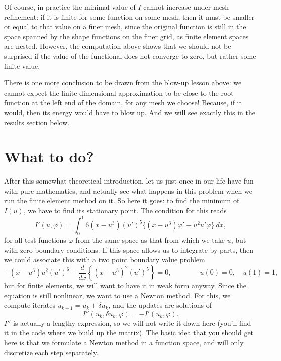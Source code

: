 \documentclass{article}
\begin{document}
Of course, in practice the minimal value of $I$ cannot increase under mesh
refinement: if it is finite for some function on some mesh, then it must be
smaller or equal to that value on a finer mesh, since the original function is
still in the space spanned by the shape functions on the finer grid, as finite
element spaces are nested. However, the computation above shows that we should
not be surprised if the value of the functional does not converge to zero, but
rather some finite value.

There is one more conclusion to be drawn from the blow-up lesson above: we
cannot expect the finite dimensional approximation to be close to the root
function at the left end of the domain, for any mesh we choose! Because, if it
would, then its energy would have to blow up. And we will see exactly this
in the results section below.


\section{What to do?}

After this somewhat theoretical introduction, let us just once in our life
have fun with pure mathematics, and actually see what happens in this problem
when we run the finite element method on it. So here it goes: to find the
minimum of $I(u)$, we have to find its stationary point. The condition for
this reads
\begin{equation*}
  I'(u,\varphi) 
  = 
  \int_0^1 6 (x-u^3) (u')^5 \{ (x-u^3)\varphi' - u^2 u' \varphi\}\ dx,
\end{equation*}
for all test functions $\varphi$ from the same space as that from which we
take $u$, but with zero boundary conditions. If this space allows us to
integrate by parts, then we could associate this with a two point boundary
value problem
\begin{equation*}
  -(x-u^3) u^2(u')^6
  - \frac{d}{dx} \left\{(x-u^3)^2 (u')^5\right\} = 0,
  \qquad\qquad u(0)=0,
  \quad u(1)=1,
\end{equation*}
but for finite elements, we will want to have it in weak form anyway. Since
the equation is still nonlinear, we want to use a Newton method. For this, we
compute iterates $u_{k+1}=u_k+\delta u_k$, and the updates are solutions of
\begin{equation*}
  I''(u_k,\delta u_k,\varphi) 
  = 
  -I'(u_k, \varphi).
\end{equation*}
$I''$ is actually a lengthy expression, so we will not write it down here
(you'll find it in the code where we build up the matrix). The basic idea that
you should get here is that we formulate a Newton method in a function space,
and will only discretize each step separately.
\end{document}
